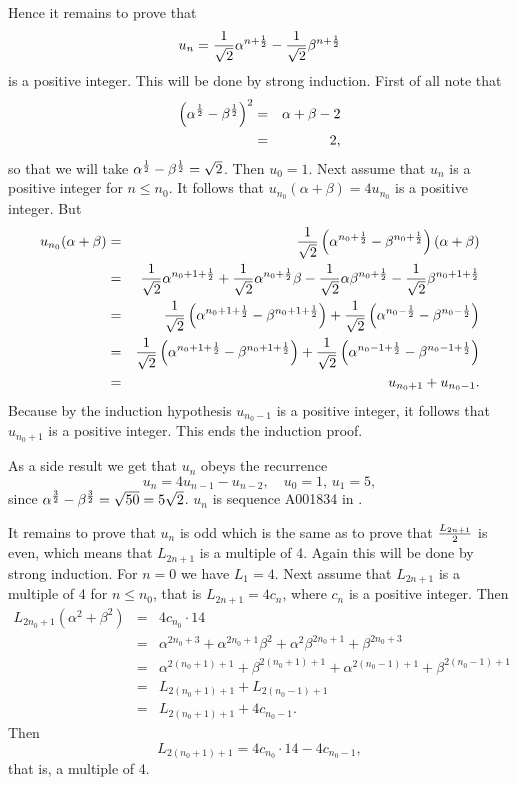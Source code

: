 Hence it remains to prove that
$$u_n=
{1\over \sqrt{2}}\alpha^{n+{1\over 2}}-
{1\over \sqrt{2}}\beta^{n+{1\over 2}}$$
is a positive integer. This will be done by strong induction. First of all
note that
\begin{eqnarray*}
\left (\alpha^{1\over 2}-\beta^{1\over 2}\right )^2&=&
\alpha+\beta-2\\
&=&2,
\end{eqnarray*}
so that we will take $\alpha^{1\over 2}-\beta^{1\over 2}=\sqrt{2}$. Then
$u_0=1$. Next assume that $u_n$ is a positive integer for $n\le n_0$. It
follows that $u_{n_0}(\alpha+\beta)=4u_{n_0}$ is a positive integer. But
\begin{eqnarray*}
u_{n_0}(\alpha+\beta)&=&
{1\over \sqrt{2}}\left (\alpha^{n_0+{1\over 2}}-
\beta^{n_0+{1\over 2}}\right )(\alpha+\beta)\\
&=&{1\over \sqrt{2}}\alpha^{n_0+1+{1\over 2}}
+{1\over \sqrt{2}}\alpha^{n_0+{1\over 2}}\beta
-{1\over \sqrt{2}}\alpha\beta^{n_0+{1\over 2}}
-{1\over \sqrt{2}}\beta^{n_0+1+{1\over 2}}\\
&=&
{1\over \sqrt{2}}\left (\alpha^{n_0+1+{1\over 2}}-
\beta^{n_0+1+{1\over 2}}\right )+
{1\over \sqrt{2}}\left (\alpha^{n_0-{1\over 2}}-
\beta^{n_0-{1\over 2}}\right )\\
&=&
{1\over \sqrt{2}}\left (\alpha^{n_0+1+{1\over 2}}-
\beta^{n_0+1+{1\over 2}}\right )+
{1\over \sqrt{2}}\left (\alpha^{n_0-1+{1\over 2}}-
\beta^{n_0-1+{1\over 2}}\right )\\
&=&u_{n_0+1}+u_{n_0-1}.
\end{eqnarray*}
Because by the induction hypothesis $u_{n_0-1}$ is a positive integer, it
follows that $u_{n_0+1}$ is a positive integer. This ends the induction
proof.

\noindent
As a side result we get that $u_n$ obeys the recurrence
$$u_n=4u_{n-1}-u_{n-2},\quad u_0=1,\,u_1=5,$$
since $\alpha^{3\over 2}-\beta^{3\over 2}=\sqrt{50}=5\sqrt{2}$. $u_n$ is
sequence A001834 in \cite{sloane}.

\noindent
It remains to prove that $u_n$ is odd which is the same as to prove that
${L_{2n+1}\over 2}$ is even, which means that $L_{2n+1}$ is a multiple of 4.
Again this will be done by strong induction.
For $n=0$ we have $L_1=4$. Next assume that $L_{2n+1}$ is a multiple of 4
for $n\le n_0$,
that is $L_{2n+1}=4c_n$, where $c_n$ is a positive integer.
Then
\begin{eqnarray*}
L_{2n_0+1}(\alpha^2+\beta^2)&=&4c_{n_0}\cdot 14\\
&=&\alpha^{2n_0+3}+\alpha^{2n_0+1}\beta^2+\alpha^2\beta^{2n_0+1}+
\beta^{2n_0+3}\\
&=&\alpha^{2(n_0+1)+1}+\beta^{2(n_0+1)+1}+\alpha^{2(n_0-1)+1}+
\beta^{2(n_0-1)+1}\\
&=&L_{2(n_0+1)+1} +L_{2(n_0-1)+1}\\
&=&L_{2(n_0+1)+1} +4c_{n_0-1}.
\end{eqnarray*}
Then
$$L_{2(n_0+1)+1}=4c_{n_0}\cdot 14-4c_{n_0-1},$$
that is, a multiple of 4.

